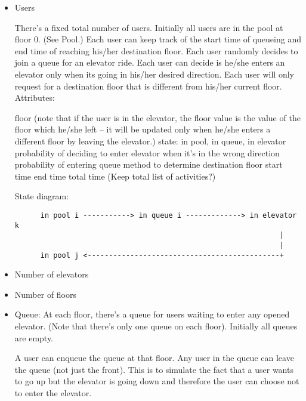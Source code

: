 \begin{itemize}
  \item Users
  \begin{tightlist}
    \li There's a fixed total number of users. Initially all users are in the
    pool at floor 0. (See Pool.)
    \li Each user can keep track of the start time of queueing and end time of
    reaching his/her destination floor.
    \li Each user randomly decides to join a queue for an elevator ride.
    \li Each user can decide is he/she enters an elevator only when
    its going in his/her desired direction.
    \li Each user will only request for a destination floor that is different
    from his/her current floor.
    \li Attributes:
    \begin{tightlist}
      \li floor (note that if the user is in the elevator, the floor value is
      the value of the floor which he/she left -- it will be updated only
      when he/she enters a different floor by leaving the elevator.)
      \li state: in pool, in queue, in elevator
      \li probability of deciding to enter elevator when it's in the wrong
      direction
      \li probability of entering queue
      \li method to determine destination floor
      \li start time
      \li end time
      \li total time
      \li (Keep total list of activities?)
    \end{tightlist}
    \li State diagram:
    \begin{Verbatim}
      in pool i -----------> in queue i -------------> in elevator k
                                                              |
                                                              |
      in pool j <---------------------------------------------+
    \end{Verbatim}
  \end{tightlist}
    
  \item Number of elevators
  \item Number of floors
  
  \item Queue:
  At each floor, there's a queue for users waiting to enter any
  opened elevator. (Note that there's only one queue on each floor).
  Initially all queues are empty.
  \begin{tightlist}
    \li A user can enqueue the queue at that floor.
    \li Any user in the queue can leave the queue (not just the front).
    This is to simulate the fact that a user wants to go up but the
    elevator is going down and therefore the user can choose not to
    enter the elevator.
  \end{tightlist}
  

\end{itemize}
